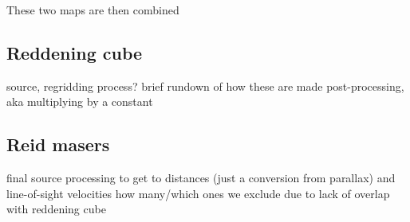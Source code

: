 These two maps are then combined 


\subsection{Reddening cube}
source, regridding process?
brief rundown of how these are made
post-processing, aka multiplying by a constant

\subsection{Reid masers}
final source
processing to get to distances (just a conversion from parallax) and line-of-sight velocities
how many/which ones we exclude due to lack of overlap with reddening cube